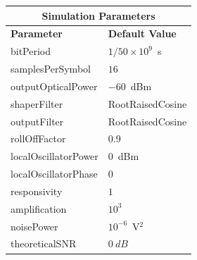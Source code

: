 \begin{refsection}
\begin{table}[H]
	\centering
	\footnotesize
	\begin{tabular}{|l|l|}
		\hline
		\multicolumn{2}{|c|}{ \textbf{Simulation Parameters} } \\
		\hline
		\textbf{Parameter}     & \textbf{Default Value}                                     \\\hline
		bitPeriod              & $1/50\times10^9$~s														\\\hline
		samplesPerSymbol       & $16$                                                       \\\hline
		outputOpticalPower     & $-60$~dBm 													\\ \hline
		shaperFilter	       & RootRaisedCosine												\\ \hline
		outputFilter		   & RootRaisedCosine												\\ \hline
		rollOffFactor		   & 0.9														\\ \hline
		localOscillatorPower   & $0$~dBm                                                    \\ \hline
		localOscillatorPhase   & $0$                                                        \\ \hline
		responsivity           & $1$                                                        \\ \hline
		amplification          & $10^3$                                                     \\ \hline
		noisePower   & $10^{-6}$~V$^2$                             					\\ \hline
				theoreticalSNR  	   & $0~dB$                             					\\ \hline

\end{tabular}
\end{table}
\end{refsection}
